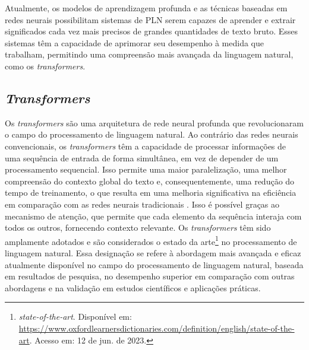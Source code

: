 
Atualmente, os modelos de aprendizagem profunda e as técnicas baseadas em redes neurais possibilitam sistemas de PLN serem capazes de aprender e extrair significados cada vez mais precisos de grandes quantidades de texto bruto. Esses sistemas têm a capacidade de aprimorar seu desempenho à medida que trabalham, permitindo uma compreensão mais avançada da linguagem natural, como os \textit{transformers}.

\subsection{\textit{Transformers}}

Os \textit{transformers} são uma arquitetura de rede neural profunda que revolucionaram o campo do processamento de linguagem natural. Ao contrário das redes neurais convencionais, os \textit{transformers} têm a capacidade de processar informações de uma sequência de entrada de forma simultânea, em vez de depender de um processamento sequencial. Isso permite uma maior paralelização, uma melhor compreensão do contexto global do texto e, consequentemente, uma redução do tempo de treinamento, o que resulta em uma melhoria significativa na eficiência em comparação com as redes neurais tradicionais \cite{GoogleTeamTransformers}. Isso é possível graças ao mecanismo de atenção, que permite que cada elemento da sequência interaja com todos os outros, fornecendo contexto relevante. Os \textit{transformers} têm sido amplamente adotados e são considerados o estado da arte\footnote{\textit{state-of-the-art}. Disponível em: \url{https://www.oxfordlearnersdictionaries.com/definition/english/state-of-the-art}. Acesso em: 12 de jun. de 2023.} no processamento de linguagem natural. Essa designação se refere à abordagem mais avançada e eficaz atualmente disponível no campo do processamento de linguagem natural, baseada em resultados de pesquisa, no desempenho superior em comparação com outras abordagens e na validação em estudos científicos e aplicações práticas.

